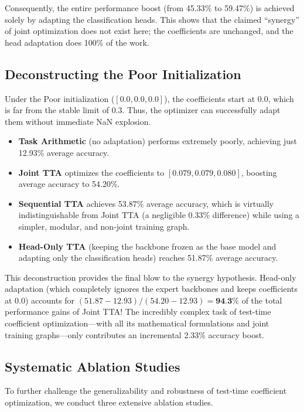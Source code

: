 \documentclass{article}
\theoremstyle{plain}
\theoremstyle{definition}
\theoremstyle{remark}
\begin{document}
Consequently, the entire performance boost (from 45.33\% to 59.47\%) is achieved solely by adapting the classification heads. This shows that the claimed ``synergy'' of joint optimization does not exist here; the coefficients are unchanged, and the head adaptation does 100\% of the work.

\subsection{Deconstructing the Poor Initialization}
Under the Poor initialization ($[0.0, 0.0, 0.0]$), the coefficients start at $0.0$, which is far from the stable limit of $0.3$. Thus, the optimizer can successfully adapt them without immediate NaN explosion.
\begin{itemize}
    \item \textbf{Task Arithmetic} (no adaptation) performs extremely poorly, achieving just 12.93\% average accuracy.
    \item \textbf{Joint TTA} optimizes the coefficients to $[0.079, 0.079, 0.080]$, boosting average accuracy to 54.20\%.
    \item \textbf{Sequential TTA} achieves 53.87\% average accuracy, which is virtually indistinguishable from Joint TTA (a negligible 0.33\% difference) while using a simpler, modular, and non-joint training graph.
    \item \textbf{Head-Only TTA} (keeping the backbone frozen as the base model and adapting only the classification heads) reaches 51.87\% average accuracy.
\end{itemize}

This deconstruction provides the final blow to the synergy hypothesis. Head-only adaptation (which completely ignores the expert backbones and keeps coefficients at 0.0) accounts for $(51.87 - 12.93) / (54.20 - 12.93) = \textbf{94.3\%}$ of the total performance gains of Joint TTA! The incredibly complex task of test-time coefficient optimization—with all its mathematical formulations and joint training graphs—only contributes an incremental 2.33\% accuracy boost.

\subsection{Systematic Ablation Studies}

To further challenge the generalizability and robustness of test-time coefficient optimization, we conduct three extensive ablation studies.
\end{document}
